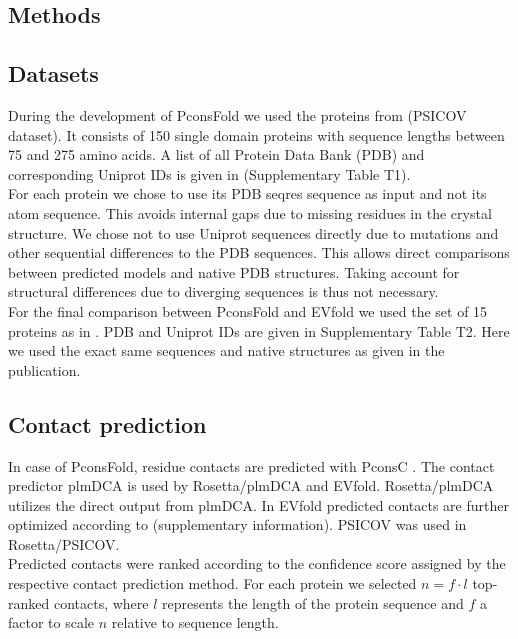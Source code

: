 \documentclass{bioinfo}
\begin{document}
\begin{methods}
\section{Methods}

\subsection{Datasets}
During the development of PconsFold we used the proteins from \citeauthor{jones_PSICOV:_2012} \citeyear{jones_PSICOV:_2012} (PSICOV dataset). It consists of 150 single domain proteins with sequence lengths between 75 and 275 amino acids. A list of all Protein Data Bank (PDB) \cite[]{berman_protein_2000} and corresponding Uniprot \cite[]{magrane_uniprot_2011} IDs is given in (Supplementary Table T1). \\\indent
For each protein we chose to use its PDB seqres sequence as input and not its atom sequence. This avoids internal gaps due to missing residues in the crystal structure. We chose not to use Uniprot sequences directly due to mutations and other sequential differences to the PDB sequences. This allows direct comparisons between predicted models and native PDB structures. Taking account for structural differences due to diverging sequences is thus not necessary. \\\indent
For the final comparison between PconsFold and EVfold we used the set of 15 proteins as in \citeauthor{marks_protein_2011} \citeyear{marks_protein_2011} . PDB and Uniprot IDs are given in Supplementary Table T2. Here we used the exact same sequences and native structures as given in the publication.

\subsection{Contact prediction}
In case of PconsFold, residue contacts are predicted with PconsC \cite[]{skwark_PconsC:_2013}. The contact predictor plmDCA \cite[]{ekeberg_improved_2013} is used by Rosetta/plmDCA and EVfold. Rosetta/plmDCA utilizes the direct output from plmDCA. In EVfold predicted contacts are further optimized according to \citeauthor{marks_protein_2011} \citeyear{marks_protein_2011} (supplementary information). PSICOV was used in Rosetta/PSICOV. \\\indent 
Predicted contacts were ranked according to the confidence score assigned by the respective contact prediction method. For each protein we selected $n = f \cdot l$ top-ranked contacts, where $l$ represents the length of the protein sequence and $f$ a factor to scale $n$ relative to sequence length. 


\end{methods}
\end{document}
